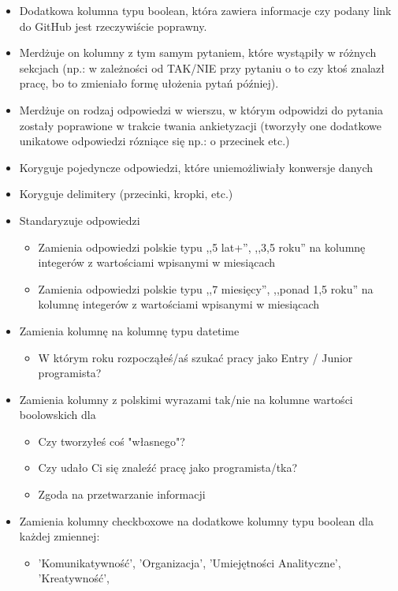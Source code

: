 \documentclass[graybox]{svmult}
\begin{document}
\begin{itemize}
  \item Dodatkowa kolumna typu boolean, która zawiera informacje czy podany link do GitHub jest rzeczywiście poprawny.
  \item Merdżuje on kolumny z tym samym pytaniem, które wystąpiły w różnych sekcjach (np.: w zależności od TAK/NIE przy pytaniu o to czy ktoś znalazł pracę, bo to zmieniało formę ułożenia pytań później).
  \item Merdżuje on rodzaj odpowiedzi w wierszu, w którym odpowidzi do pytania zostały poprawione w trakcie twania ankietyzacji (tworzyły one dodatkowe unikatowe odpowiedzi rózniące się np.: o przecinek etc.)
  \item Koryguje pojedyncze odpowiedzi, które uniemożliwiały konwersje danych
  \item Koryguje delimitery (przecinki, kropki, etc.)
  \item Standaryzuje odpowiedzi
  \begin{itemize}
    \item Zamienia odpowiedzi polskie typu ,,5 lat+'', ,,3,5 roku'' na kolumnę integerów z wartościami wpisanymi w miesiącach
    \item Zamienia odpowiedzi polskie typu ,,7 miesięcy'', ,,ponad 1,5 roku'' na kolumnę integerów z wartościami wpisanymi w miesiącach
  \end{itemize}
  \item Zamienia kolumnę na kolumnę typu datetime
  \begin{itemize}
    \item W którym roku rozpocząłeś/aś szukać pracy jako Entry / Junior programista?
  \end{itemize}
  \item Zamienia kolumny z polskimi wyrazami tak/nie na kolumne wartości boolowskich dla
  \begin{itemize}
    \item Czy tworzyłeś coś "własnego"?
    \item Czy udało Ci się znaleźć pracę jako programista/tka?
    \item Zgoda na przetwarzanie informacji
  \end{itemize}
  \item Zamienia kolumny checkboxowe na dodatkowe kolumny typu boolean dla każdej zmiennej:
  \begin{itemize}
    \item 'Komunikatywność', 'Organizacja', 'Umiejętności Analityczne', 'Kreatywność',

\end{itemize}
\end{itemize}
\end{document}
